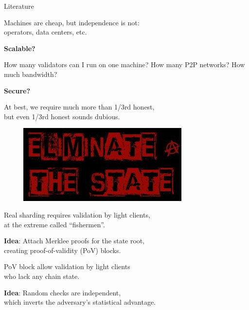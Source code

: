 \documentclass[final]{beamer}
\newlength{\onecolwid}
\begin{document}
\begin{frame}[t]
\begin{columns}[t]
\begin{column}{\onecolwid}
\begin{block}{Literature}
\medskip

Machines are cheap, but independence is not: \\ 
\hspace*{5pt}  operators, data centers, etc.

\bigskip

\textbf{Scalable?}

How many validators can I run on one machine?  How many P2P networks?  How much bandwidth?

\bigskip

\textbf{Secure?}

At best, we require much more than 1/3rd honest, \\
\hspace*{5pt}  but even 1/3rd honest sounds dubious.

\bigskip
\bigskip
\bigskip

\begin{figure}
\includegraphics[width=0.8\linewidth]{eliminate-small.jpg}
\end{figure}

\bigskip

Real sharding requires validation by light clients, \\
\hspace*{5pt} at the extreme called ``fishermen''.

\bigskip

\textbf{Idea}:  Attach Merklee proofs for the state root, \\
\hspace*{5pt}  creating proof-of-validity (PoV) blocks.

\bigskip

PoV block allow validation by light clients \\ who lack any chain state.

\bigskip
\bigskip

\textbf{Idea}:  Random checks are independent, \\
\hspace*{5pt} which inverts the adversary's statistical advantage.


\end{block}
\end{column}
\end{columns}
\end{frame}
\end{document}
